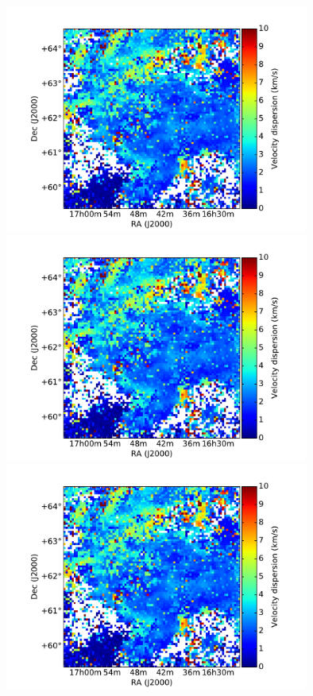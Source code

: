 \documentclass[traditabstract]{aa}
\begin{document}
\begin{figure}[h]
  \centering
  \includegraphics[page=1,height=7.5cm,trim=110 35 105 75,clip=true]{Figures/GHIGLS_disp.pdf}
  \hspace{5mm}
  \includegraphics[page=4,height=7.5cm,trim=110 35 105 75,clip=true]{Figures/GHIGLS_disp.pdf} \\
  \vspace{5mm}
  \includegraphics[page=2,height=7.5cm,trim=110 35 105 75,clip=true]{Figures/GHIGLS_disp.pdf}

\end{figure}
\end{document}
